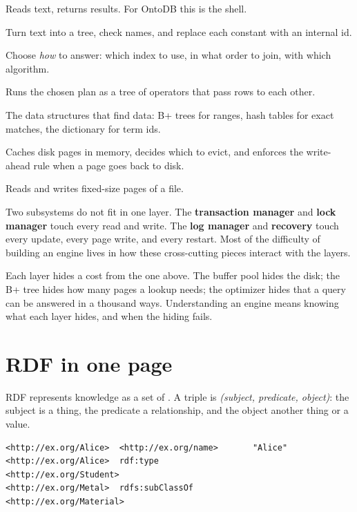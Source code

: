 \begin{description}[leftmargin=1.2em]
\item[Interface] Reads text, returns results. For OntoDB this is the  shell.
\item[Parser and binder] Turn text into a tree, check names, and replace each constant with an internal id.
\item[Planner and optimizer] Choose \emph{how} to answer: which index to use, in what order to join, with which algorithm.
\item[Execution engine] Runs the chosen plan as a tree of operators that pass rows to each other.
\item[Access methods] The data structures that find data: B+ trees for ranges, hash tables for exact matches, the dictionary for term ids.
\item[Buffer pool] Caches disk pages in memory, decides which to evict, and enforces the write-ahead rule when a page goes back to disk.
\item[Disk manager] Reads and writes fixed-size pages of a file.
\end{description}

Two subsystems do not fit in one layer. The \textbf{transaction manager} and
\textbf{lock manager} touch every read and write. The \textbf{log manager}
and \textbf{recovery} touch every update, every page write, and every restart.
Most of the difficulty of building an engine lives in how these cross-cutting
pieces interact with the layers.

\begin{keyidea}
Each layer hides a cost from the one above. The buffer pool hides the disk; the
B+ tree hides how many pages a lookup needs; the optimizer hides that a query
can be answered in a thousand ways. Understanding an engine means knowing what
each layer hides, and when the hiding fails.
\end{keyidea}

\section{RDF in one page}

RDF represents knowledge as a set of . A triple is
\emph{(subject, predicate, object)}: the subject is a thing, the predicate a
relationship, and the object another thing or a value.

\begin{lstlisting}
<http://ex.org/Alice>  <http://ex.org/name>       "Alice"
<http://ex.org/Alice>  rdf:type                   <http://ex.org/Student>
<http://ex.org/Metal>  rdfs:subClassOf            <http://ex.org/Material>
\end{lstlisting}

